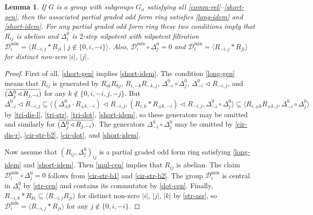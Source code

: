 \documentclass{article}
\newtheorem{lemma}{Lemma}
\theoremstyle{definition}
\newcommand{\inv}[1]{
    \!\;\overline{
        \!\!\:#1\vphantom !\!\!\:
    }\;\!
}
\begin{document}
\begin{lemma} \label{idem-par-ofr}
    If \(G\) is a group with subgroups \(G_\alpha\) satisfying all \ref{comm-rel}--\ref{short-gen}, then the associated partial graded odd form ring satisfies \ref{long-idem} and \ref{short-idem}. For any partial graded odd form ring these two conditions imply that \(R_{ij}\) is abelian and \(\Delta^0_i\) is \(2\)-step nilpotent with nilpotent filtration \(
        \mathcal D_i^{\mathrm{min}} = \langle
            R_{-i, j} * R_{ji}
            \mid
            j \notin \{0, i, -i\}
        \rangle
    \). Also, \(
        \mathcal D_i^{\mathrm{min}} \circ \Delta^0_j
        = 0
    \) and \(
        \mathcal D^{\mathrm{min}}_i = \langle
            R_{-i, j} * R_{ji}
        \rangle
    \) for distinct non-zero \(|i|\), \(|j|\).
\end{lemma}
\begin{proof}
    First of all, \ref{short-gen} implies \ref{short-idem}. The condition \ref{long-gen} means that \(R_{ij}\) is generated by \(
        R_{ik} R_{kj}
    \), \(
        R_{i, -k} R_{-k, j}
    \), \(
        \Delta^0_{-i} \circ \Delta^0_j
    \), \(
        \Delta^0_{-i} \triangleleft R_{-i, j}
    \), and \(
        \inv{
            (\Delta^0_j \triangleleft R_{j, -i})
        }
    \) for any \(
        k \notin \{0, i, -i, j, -j\}
    \). But \[
        \Delta^0_{-i} \triangleleft R_{-i, j}
        \subseteq
        \bigl\langle
            (
                \Delta^0_{\pm k} \cdot R_{\pm k, -i}
            ) \triangleleft R_{-i, j},
            (
                R_{i, k} * R_{\pm k, -i}
            ) \triangleleft R_{-i, j},
            \Delta^0_{-i} \circ \Delta^0_j
        \bigr\rangle
        \subseteq
        \langle
            R_{i, \pm k} R_{\pm k, j},
            \Delta^0_{-i} \circ \Delta^0_j
        \rangle
    \]
    by \ref{tri-dis-l}, \ref{tri-str}, \ref{tri-dot}, \ref{short-idem}, so these generators may be omitted and similarly for \(
        \inv{
            (\Delta^0_j \triangleleft R_{j, -i})
        }
    \). The generators \(
        \Delta^0_{-i} \circ \Delta^0_j
    \) may be omitted by \ref{cir-dis-r}, \ref{cir-str-b2}, \ref{cir-dot}, and \ref{short-idem}.

    Now assume that \((R_{ij}, \Delta^0_j)_{ij}\) is a partial graded odd form ring satisfying \ref{long-idem} and \ref{short-idem}. Then \ref{mul-cen} implies that \(R_{ij}\) is abelian. The claim \(
        \mathcal D^{\mathrm{min}}_i \circ \Delta^0_j
        = 0
    \)
    follows from \ref{cir-str-b1} and \ref{cir-str-b2}. The group \(
        \mathcal D^{\mathrm{min}}_i
    \) is central in \(\Delta^0_i\) by \ref{str-cen} and contains its commutator by \ref{dot-cen}. Finally, \(
        R_{-i, k} * R_{ki}
        \subseteq
        \langle R_{-i, j} R_{ji} \rangle
    \) for distinct non-zero \(|i|\), \(|j|\), \(|k|\) by \ref{str-ass}, so \(
        \mathcal D^{\mathrm{min}}_i
        =
        \langle R_{-i, j} * R_{ji} \rangle
    \) for any \(
        j \notin \{0, i, -i\}
    \).
\end{proof}
\end{document}
